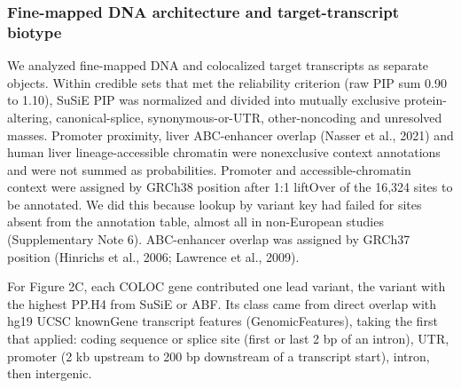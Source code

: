 \subsubsection{Fine-mapped DNA architecture and target-transcript biotype}\label{fine-mapped-dna-architecture-and-target-transcript-biotype}

We analyzed fine-mapped DNA and colocalized target transcripts as separate objects. Within credible sets that met the reliability criterion (raw PIP sum 0.90 to 1.10), SuSiE PIP was normalized and divided into mutually exclusive protein-altering, canonical-splice, synonymous-or-UTR, other-noncoding and unresolved masses. Promoter proximity, liver ABC-enhancer overlap (Nasser et al., 2021) and human liver lineage-accessible chromatin were nonexclusive context annotations and were not summed as probabilities. Promoter and accessible-chromatin context were assigned by GRCh38 position after 1:1 liftOver of the 16,324 sites to be annotated. We did this because lookup by variant key had failed for sites absent from the annotation table, almost all in non-European studies (Supplementary Note 6). ABC-enhancer overlap was assigned by GRCh37 position (Hinrichs et al., 2006; Lawrence et al., 2009).

For Figure 2C, each COLOC gene contributed one lead variant, the variant with the highest PP.H4 from SuSiE or ABF. Its class came from direct overlap with hg19 UCSC knownGene transcript features (GenomicFeatures), taking the first that applied: coding sequence or splice site (first or last 2 bp of an intron), UTR, promoter (2 kb upstream to 200 bp downstream of a transcript start), intron, then intergenic.

